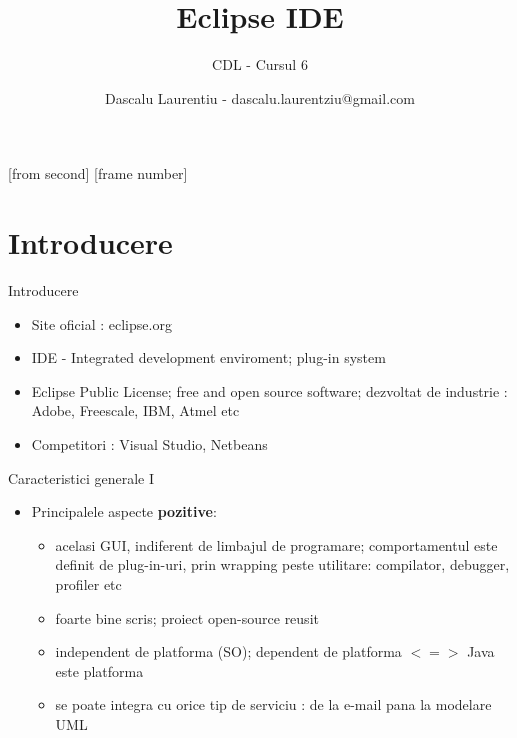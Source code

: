 \documentclass{beamer}
\title[Eclipse IDE]{Eclipse IDE}
\subtitle{CDL - Cursul 6}
\institute{Ceata}
\author{Dascalu Laurentiu - dascalu.laurentziu@gmail.com}
\begin{document}
[from second]
[frame number]

\frame{\titlepage}

\frame{\tableofcontents}

\section{Introducere}

\frame{\tableofcontents[currentsection]}

\begin{frame}{Introducere}
  \begin{itemize}
   \item Site oficial : eclipse.org
   \item IDE - Integrated development enviroment; plug-in system
   \item Eclipse Public License; free and open source software; dezvoltat de industrie : Adobe, Freescale, IBM, Atmel etc
   \item Competitori : Visual Studio, Netbeans
  \end{itemize}
\end{frame}

\begin{frame}{Caracteristici generale I}
  \begin{itemize}
    \item Principalele aspecte \textbf{pozitive}:
    \begin{itemize}
      \item acelasi GUI, indiferent de limbajul de programare; comportamentul este definit de plug-in-uri, prin wrapping peste utilitare: compilator, debugger, profiler etc
      \item foarte bine scris; proiect open-source reusit
      \item independent de platforma (SO); dependent de platforma $<=>$ Java este platforma
      \item se poate integra cu orice tip de serviciu : de la e-mail pana la modelare UML
    \end{itemize}
  \end{itemize}
\end{frame}
\end{document}
